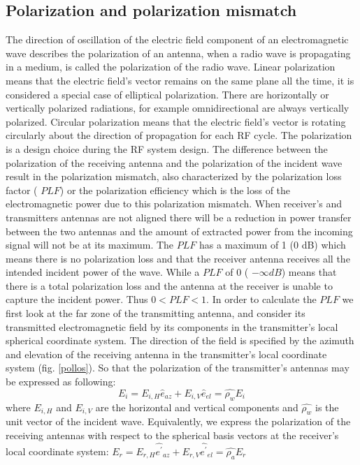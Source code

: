 \subsection{Polarization and polarization mismatch}

The direction of oscillation of the electric field component of an electromagnetic wave describes the polarization of an antenna, when a radio wave is propagating in a medium, is called the polarization of the radio wave. Linear polarization means that the electric field’s vector remains on the same plane all the time, it is considered a special case of elliptical polarization. There are horizontally or vertically polarized radiations, for example omnidirectional are always vertically polarized. Circular polarization means that the electric field’s vector is rotating circularly about the direction of propagation for each RF cycle. The polarization is a design choice during the RF system design.
The difference between the polarization of the receiving antenna and the polarization of the incident wave result in the polarization mismatch, also characterized by the polarization loss factor ( $PLF$) or the polarization efficiency which is the loss of the electromagnetic power due to this polarization mismatch. When receiver’s and transmitters antennas are not aligned there will be a reduction in power transfer between the two antennas and the amount of extracted power from the incoming signal will not be at its maximum. The $PLF$ has a maximum of 1 (0 dB) which means there is no polarization loss and that the receiver antenna receives all the intended incident power of the wave. While a $PLF$ of 0 ( $ -\infty dB$) means that there is a total polarization loss and the antenna at the receiver is unable to capture the incident power. Thus  $0<PLF<1$. In order to calculate the $PLF$ we first look at the far zone of the transmitting antenna, and consider its transmitted electromagnetic field by its components in the transmitter's local spherical coordinate system. The direction of the field is specified by the azimuth and elevation of the receiving antenna in the transmitter's local coordinate system (fig. \ref{pollos}). So that the polarization of the transmitter's antennas may be expressed as following:
\begin{equation}
E_{i}= E_{i,H}\hat{e}_{az}+ E_{i,V}\hat{e}_{el}= \widehat{ \rho _{w}}E_{i} \label{eq_pollos}
\end{equation}
where $E_{i,H}$ and  $E_{i,V}$  are the horizontal and vertical components and  $\widehat{ \rho _{w}}$ is the unit vector of the incident wave. Equivalently, we express the polarization of the receiving antennas with respect to the spherical basis vectors at the receiver's local coordinate system:  $E_{r}= E_{r,H}\widehat{e^{'}}_{az}+ E_{r,V}\widehat{e^{'}}_{el}= \widehat{ \rho _{a}}E_{r}$

